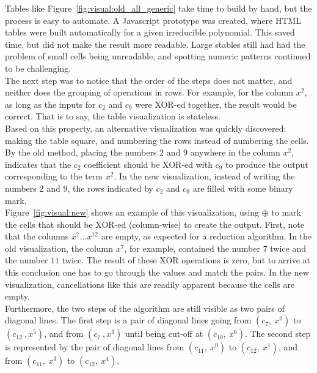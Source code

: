 Tables like Figure~\ref{fig:visual:old_all_generic} take time to build by hand, but the process is easy to automate. A Javascript prototype was created, where HTML tables were built automatically for a given irreducible polynomial. This saved time, but did not make the result more readable. Large stables still had had the problem of small cells being unreadable, and spotting numeric patterns continued to be challenging. \\

The next step was to notice that the order of the steps does not matter, and neither does the grouping of operations in rows. For example, for the column $x^2$, as long as the inputs for $c_2$ and $c_9$ were XOR-ed together, the result would be correct. That is to say, the table visualization is stateless. \\

Based on this property, an alternative visualization was quickly discovered: making the table square, and numbering the rows instead of numbering the cells. By the old method, placing the numbers $2$ and $9$ anywhere in the column $x^2$, indicates that the $c_2$ coefficient should be XOR-ed with $c_9$ to produce the output corresponding to the term $x^2$. In the new visualization, instead of writing the numbers $2$ and $9$, the rows indicated by $c_2$ and $c_9$ are filled with some binary mark. \\

Figure~\ref{fig:visual:new} shows an example of this visualization, using $\oplus$ to mark the cells that should be XOR-ed (column-wise) to create the output. First, note that the columns $x^7 \ldots x^{12}$ are empty, as expected for a reduction algorithm. In the old visualization, the column $x^7$, for example, contained the number $7$ twice and the number $11$ twice. The result of these XOR operations is zero, but to arrive at this conclusion one has to go through the values and match the pairs. In the new visualization, cancellations like this are readily apparent because the cells are empty. \\

Furthermore, the two steps of the algorithm are still visible as two pairs of diagonal lines. The first step is a pair of diagonal lines going from $(c_7,~x^0)$ to $(c_{12}~,x^5)$, and from $(c_7~,x^3)$ until being cut-off at $(c_{10},~x^6)$. The second step is represented by the pair of diagonal lines from $(c_{11},~x^0)$ to $(c_{12},~x^1)$, and from $(c_{11},~x^3)$ to $(c_{12},~x^4)$. \\

